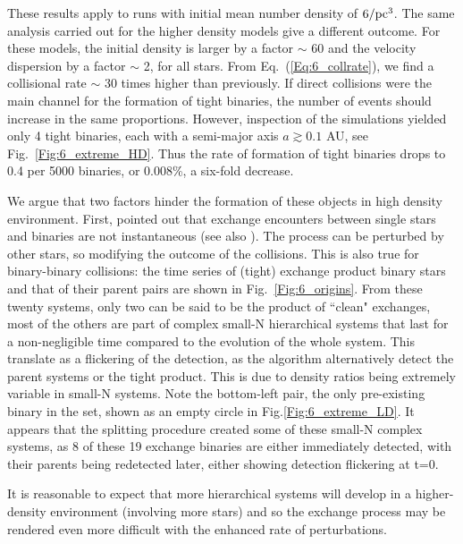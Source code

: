 
 These results apply to runs with initial mean number density of $6 / {\textrm{pc}}^3$.  The same analysis carried out for the higher 
 density models give a different outcome. 
For these models, the initial density is larger by a factor $\sim$ 60 and the velocity dispersion  by a factor $\sim$ 2, 
for all stars. From Eq.~(\ref{Eq:6_collrate}),  we find a collisional rate  $\sim$ 30 times higher than previously. 
If direct collisions were 
the main channel for the formation of tight binaries, the number of events should  increase in the same proportions.
However, inspection of the simulations yielded only 4 tight binaries, each  with a semi-major axis $a \gtrsim 0.1$ AU, see Fig.~\ref{Fig:6_extreme_HD}. Thus the rate of formation of tight binaries drops to 0.4 per 5000 binaries, or 0.008\%, a six-fold decrease. 


We argue that two factors hinder the formation of these objects in high density environment. First, \cite{Geller2015} pointed out  that exchange encounters between single stars and binaries are not instantaneous (see also \citealt{Hut1983}).  The process can be perturbed by other stars, so modifying the outcome of the collisions. This is also true for binary-binary collisions: the time series of (tight) exchange product binary stars and that of their parent pairs are shown in Fig.~\ref{Fig:6_origins}. From these twenty systems, only two can be said to be the product of ``clean" exchanges, most of the others are part of complex small-N hierarchical systems that last for a non-negligible time compared to the evolution of the whole system. This translate as a flickering of the detection, as the algorithm alternatively detect the parent systems or the tight product. This is due to density ratios being extremely variable in small-N systems. Note the bottom-left pair, the only pre-existing binary in the set, shown as an empty circle in Fig.\ref{Fig:6_extreme_LD}. It appears that the splitting procedure created some of these small-N complex systems, as 8 of these 19 exchange binaries are either immediately detected, with their parents being redetected later, either showing detection flickering at t=0. 

It is reasonable to  expect that more hierarchical systems will develop in a higher-density environment (involving more stars)  and so the exchange process may be rendered even more difficult with the enhanced rate of perturbations.



